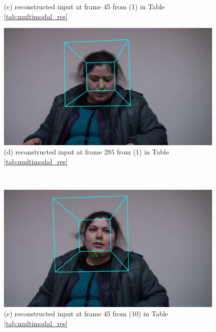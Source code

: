 \begin{figure}[htb]
\begin{minipage}[c]{0.42\linewidth}
    (c) reconstructed input at frame 45 from (1) in Table \ref{tab:multimodal_res}
    \end{minipage}
    \begin{minipage}[c]{0.42\linewidth}
    \centering
    \includegraphics[width=\textwidth]{images/facial/recons_285_face_0_multiDDAE_mfcc.png} \\
    (d) reconstructed input at frame 285 from (1) in Table \ref{tab:multimodal_res}
    \end{minipage}
    \\
    \begin{minipage}[c]{0.42\linewidth}
    \centering
    \includegraphics[width=\textwidth]{images/facial/recons_45_face_0_multiDDAE_egemaps.png} \\
    (e) reconstructed input at frame 45 from (10) in Table \ref{tab:multimodal_res}
    \end{minipage}
    \begin{minipage}[c]{0.42\linewidth}
    \centering

\end{minipage}
\end{figure}
